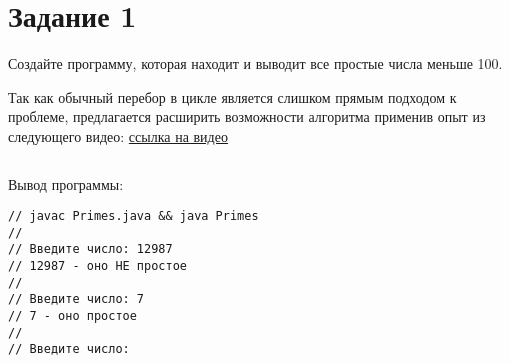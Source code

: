 \chapter*{Задание 1}
\label{ch:Task1}
Создайте программу, которая находит и выводит все простые числа меньше 100.

Так как обычный перебор в цикле является слишком прямым подходом к проблеме, предлагается расширить возможности алгоритма применив опыт из следующего видео: \href{https://www.youtube.com/watch?v=tBzaMfV94uA}{ссылка на видео}


\inputminted{java}{../src/part1/Primes.java}

Вывод программы:
\begin{verbatim}
// javac Primes.java && java Primes
//
// Введите число: 12987
// 12987 - оно НЕ простое
// 
// Введите число: 7
// 7 - оно простое
// 
// Введите число:

\end{verbatim}

\endinput

